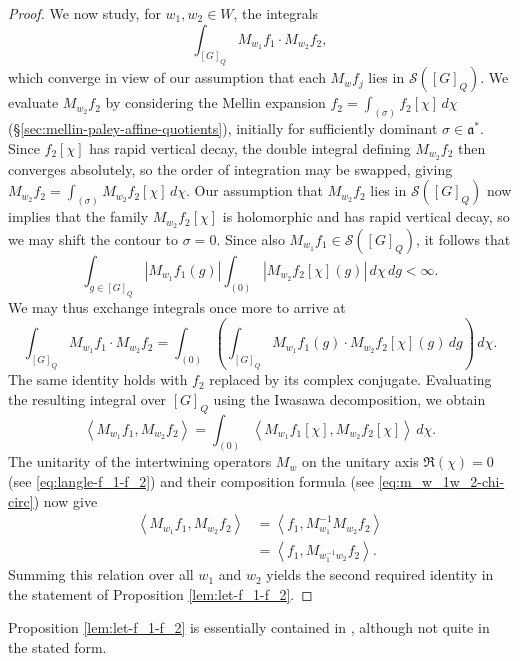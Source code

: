 \begin{proof}
  We now study, for $w_1, w_2 \in W$, the integrals
  \begin{equation*}
    \int_{[G]_Q} M_{w_1} f_1 \cdot M_{w_2} f_2,
  \end{equation*}
  which converge in view of our assumption that each $M_w f_j$ lies in $\mathcal{S}([G]_Q)$.  We evaluate $M_{w_2} f_2$ by considering the Mellin expansion $f_2 = \int_{(\sigma)} f_2[\chi] \, d \chi$ (\S\ref{sec:mellin-paley-affine-quotients}), initially for sufficiently dominant $\sigma \in \mathfrak{a}^*$.  Since $f_2[\chi]$ has rapid vertical decay, the double integral defining $M_{w_2} f_2$ then converges absolutely, so the order of integration may be swapped, giving $M_{w_2} f_2 = \int_{(\sigma)} M_{w_2} f_2[\chi] \, d \chi$.  Our assumption that $M_{w_2} f_2$ lies in $\mathcal{S}([G]_Q)$ now implies that the family $M_{w_2} f_2[\chi]$ is holomorphic and has rapid vertical decay, so we may shift the contour to $\sigma = 0$.  Since also $M_{w_1} f_1 \in \mathcal{S}([G]_Q)$, it follows that
  \begin{equation*}
    \int_{g \in [G]_Q} |M_{w_1} f_1(g)| \int_{(0)} \left\lvert M_{w_2} f_2[\chi](g)  \right\rvert \, d \chi \, d g < \infty.
  \end{equation*}
  We may thus exchange integrals once more to arrive at
  \begin{equation*}
    \int_{[G]_Q} M_{w_1} f_1 \cdot M_{w_2} f_2
    = \int_{(0)} \left( \int_{[G]_Q} M_{w_1} f_1(g) \cdot M_{w_2} f_2[\chi](g) \, d g \right) \, d \chi.
  \end{equation*}
  The same identity holds with $f_2$ replaced by its complex conjugate.  Evaluating the resulting integral over $[G]_Q$ using the Iwasawa decomposition, we obtain
  \begin{equation*}
    \left\langle M_{w_1} f_1, M_{w_2} f_2 \right\rangle
    =
    \int_{(0)}
    \left\langle M_{w_1} f_1[\chi], M_{w_2} f_2[\chi] \right\rangle \, d \chi.
  \end{equation*}
  The unitarity of the intertwining operators $M_w$ on the unitary axis $\Re(\chi) = 0$ (see \eqref{eq:langle-f_1-f_2}) and their composition formula (see \eqref{eq:m_w_1w_2-chi-circ}) now give
  \begin{align*}
    \left\langle M_{w_1} f_1, M_{w_2} f_2 \right\rangle
    &=
      \left\langle f_1, M_{w_1}^{-1} M_{w_2} f_2 \right\rangle \\
    &=
      \left\langle f_1, M_{w_1^{-1} w_2} f_2 \right\rangle.
  \end{align*}
  Summing this relation over all $w_1$ and $w_2$ yields the second required identity in the statement of Proposition \ref{lem:let-f_1-f_2}.
\end{proof}
\begin{remark}
  Proposition \ref{lem:let-f_1-f_2} is essentially contained in \cite[\S3.6.6, p384]{MR3468638},  although not quite in the stated form.
\end{remark}




